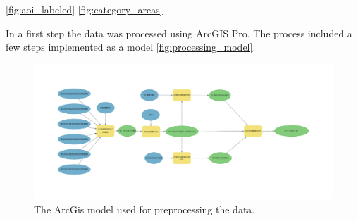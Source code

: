 \autoref{fig:aoi_labeled}
\autoref{fig:category_areas}



In a first step the data was processed using ArcGIS Pro. The process included a few steps implemented as
a model \autoref{fig:processing_model}.

\begin{figure}
    \centering
    \captionsetup{width=0.8\linewidth}
    \includegraphics[width=\linewidth]{figures/Model.pdf}
    \caption{The ArcGis model used for preprocessing the data.}
    \label{fig:processing_model}
\end{figure}